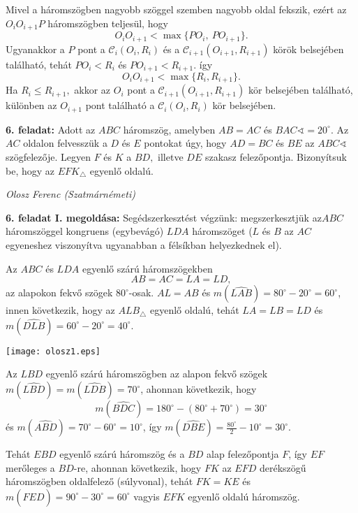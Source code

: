 \documentclass[a4paper,10pt]{article}
\def\ki#1#2{\hfill {\it #1 (#2)}\medskip}
\begin{document}
Mivel a háromszögben nagyobb szöggel szemben nagyobb ol\-dal
fekszik, ezért az $O_iO_{i+1}P$ háromszögben teljesül, hogy
$$O_iO_{i+1}<\max\{PO_i,\ PO_{i+1}\}.$$ Ugyanakkor a $P$ pont a
$\mathcal{C}_i(O_i,R_i)$ és a $\mathcal{C}_{i+1}(O_{i+1},R_{i+1})$
körök belsejében található, tehát $PO_i<R_i$ és
$PO_{i+1}<R_{i+1}.$ így
\[O_iO_{i+1}<\max\{R_i, R_{i+1}\}.\]
Ha $R_i\le R_{i+1},$ akkor az $O_i$ pont a
$\mathcal{C}_{i+1}(O_{i+1},R_{i+1})$ kör belsejében található,
különben az $O_{i+1}$ pont található a $\mathcal{C}_i(O_i,R_i)$
kör belsejében.

\medskip


{\bf 6. feladat: } Adott az $ABC$ háromszög, amelyben $AB=AC$ és
$BAC\sphericalangle=20^{\circ}.$ Az $AC$ oldalon felvesszük a $D$
és $E$ pontokat úgy, hogy $AD=BC$ és $BE$ az $ABC\sphericalangle$
szögfelezője. Legyen $F$ és $K$ a $BD,$ illetve $DE$ szakasz
felezőpontja. Bizonyítsuk be, hogy az $EFK_{\triangle}$
egyenlő oldalú.

\ki{Olosz Ferenc}{Szatmárnémeti}\medskip

\textbf{6. feladat I. megoldása: } Segédszerkesztést végzünk:
megszerkesztjük az\linebreak  $ABC$ háromszöggel kongruens
(egybevágó) $LDA$ háromszöget ($L$ és $B$ az $AC$ egyeneshez
viszonyítva ugyanabban a félsíkban helyezkednek el).

Az $ABC$ és $LDA$ egyenlő szárú háromszögekben
$$AB=AC=LA=LD,$$ az alapokon fekvő szögek $80^{\circ}$-osak. $AL=AB$
és $m(\widehat{LAB})=80^{\circ}-20^{\circ}=60^{\circ}$, innen
következik, hogy az $ALB_{\triangle}$ egyenlő oldalú, tehát
$LA=LB=LD$ és $m(\widehat{DLB})=60^{\circ}-20^{\circ}=40^{\circ}$.

\centerline{\texttt{[image: olosz1.eps]}}


Az $LBD$ egyenlő szárú háromszögben az alapon fekvő szögek
$m(\widehat{LBD})=m(\widehat{LDB})=70^{\circ}$, ahonnan következik,
hogy
$$m(\widehat{BDC})=180^{\circ}-(80^{\circ}+70^{\circ})=30^{\circ}$$ és
$m(\widehat{ABD})=70^{\circ}-60^{\circ}=10^{\circ}$, így
$m(\widehat{DBE})=\frac{80^{\circ}}{2}-10^{\circ}=30^{\circ}.$

Tehát $EBD$ egyenlő szárú háromszög és a $BD$ alap felező\-pontja
$F$, így $EF$ merőleges a $BD$-re, ahonnan következik, hogy $FK$ az
$EFD$ derékszögű háromszögben oldalfelező (súlyvonal), tehát $FK=KE$
és $m(\widehat{FED})=90^{\circ}-30^{\circ}=60^{\circ}$ vagyis $EFK$
egyenlő oldalú háromszög.

\medskip
\end{document}

